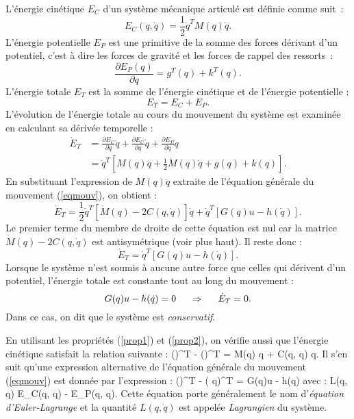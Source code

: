 L'énergie cinétique $E_C$ d'un système mécanique articulé est définie comme suit~:
$$
E_C(q,\dot q) =  \frac{1}{2} \dot q^T M(q) \dot q.
$$
L'énergie potentielle $E_P$ est une primitive de la somme des forces dérivant d'un
potentiel, c'est à dire les forces de gravité et les forces de rappel des ressorts~:
$$
\frac{\partial E_P(q)}{\partial q} = g^T(q) + k^T(q).
$$
L'énergie totale $E_T$ est la somme de l'énergie cinétique et de l'énergie potentielle :
$$
E_T = E_C + E_P.
$$
L'évolution de l'énergie totale au cours du mouvement du système est examinée en
calculant sa dérivée temporelle :
\begin{equation} \begin{split}
\dot E_T &= \frac{\partial E_C}{\partial \dot q}\ddot q + \frac{\partial E_C}{\partial q}\dot q
+ \frac{\partial E_P}{\partial q}\dot q \\
&= \dot q^T [M(q) \ddot q + \frac{1}{2} \dot M(q) \dot q + g(q) + k(q)].
\end{split} \end{equation}
En substituant l'expression de $M(q)\ddot q$ extraite de l'équation générale du mouvement
(\ref{eqmouv}), on obtient :
$$
\dot E_T = \frac{1}{2} \dot q^T [\dot M(q) - 2C(q,\dot q)] \dot q + \dot q^T [G(q)u - h(\dot q)].
$$
Le premier terme du membre de droite de cette équation est nul car la matrice $\dot M(q) - 2C(q,\dot q)$
est antisymétrique (voir plus haut). Il reste donc :
$$
\dot E_T = \dot q^T [G(q)u - h(\dot q)].
$$
Lorsque le système n'est soumis à aucune autre force que celles qui dérivent d'un
potentiel, l'énergie totale est constante tout au long du mouvement :
$$
G(q)u - h(\dot q) = 0 \hspace{5mm} \Rightarrow \hspace{5mm} \dot E_T = 0.
$$
Dans ce cas, on dit que le système est {\em conservatif}.

En utilisant les propriétés (\ref{prop1}) et (\ref{prop2}), on vérifie aussi que l'énergie
cinétique satisfait la relation suivante :
\eqnn
{}()^T - ()^T = 
M(q)  \ddot q + C(q, \dot q) \dot q.
\eeqnn
Il s'en suit qu'une expression alternative de l'équation générale du mouvement (\ref{eqmouv})
est donnée par l'expression :
\eqnn
{} ()^T - (
{\partial q})^T = G(q)u - h(\dot q)
\eeqnn
avec :
\eqnn
L(q, \dot q) \triangleq E_C(q, \dot q) - E_P(q, \dot q).
\eeqnn
Cette équation porte généralement le nom d'{\em équation d'Euler-Lagrange} et la
quantité $L(q, \dot q)$ est appelée {\em Lagrangien} du système.

